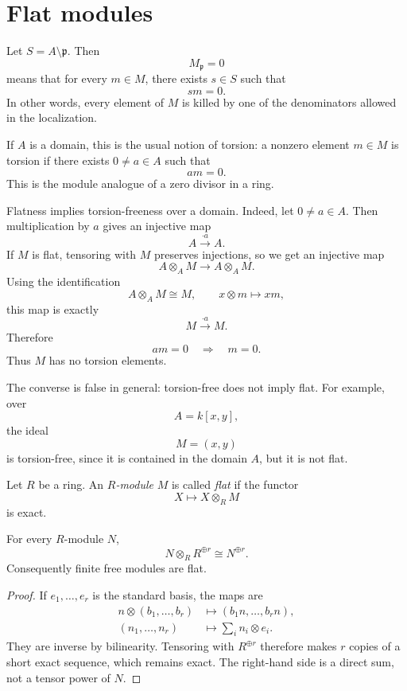 \section{Flat modules}
\label{section-flat-modules}

\noindent
Let $S=A\setminus \mathfrak p$. Then
$$
M_{\mathfrak p}=0
$$
means that for every $m\in M$,
there exists $s\in S$ such that
$$
sm=0.
$$
In other words, every element of $M$
is killed by one of the denominators
allowed in the localization.

If $A$ is a domain, this is the usual
notion of torsion: a nonzero element
$m\in M$ is torsion if there exists
$0\neq a\in A$ such that
$$
am=0.
$$
This is the module analogue of a zero
divisor in a ring.

Flatness implies torsion-freeness over
a domain. Indeed, let $0\neq a\in A$.
Then multiplication by $a$ gives an
injective map
$$
A \xrightarrow{\cdot a} A.
$$
If $M$ is flat, tensoring with $M$
preserves injections, so we get an
injective map
$$
A\otimes_A M
\longrightarrow
A\otimes_A M.
$$
Using the identification
$$
A\otimes_A M \cong M,
\qquad
x\otimes m \mapsto xm,
$$
this map is exactly
$$
M \xrightarrow{\cdot a} M.
$$
Therefore
$$
am=0
\quad\Longrightarrow\quad
m=0.
$$
Thus $M$ has no torsion elements.

The converse is false in general:
torsion-free does not imply flat.
For example, over
$$
A=k[x,y],
$$
the ideal
$$
M=(x,y)
$$
is torsion-free, since it is contained
in the domain $A$, but it is not flat.

\begin{definition}
\label{definition-flat-module}
Let $R$ be a ring.
An {\it $R$-module} $M$ is called
{\it flat}
if the functor
$$
X \mapsto X \otimes_R M
$$
is exact.
\end{definition}

\begin{lemma}
\label{lemma-free-tensor-copies}
For every $R$-module $N$,
$$
N\otimes_R R^{\oplus r}\cong N^{\oplus r}.
$$
Consequently finite free modules are flat.
\end{lemma}

\begin{proof}
If $e_1,\ldots,e_r$ is the standard
basis, the maps are
$$
\begin{aligned}
n\otimes(b_1,\ldots,b_r)
&\longmapsto(b_1n,\ldots,b_rn),\\
(n_1,\ldots,n_r)
&\longmapsto\sum_i n_i\otimes e_i.
\end{aligned}
$$
They are inverse by bilinearity.
Tensoring with $R^{\oplus r}$ therefore
makes $r$ copies of a short exact
sequence, which remains exact.
The right-hand side is a direct sum,
not a tensor power of $N$.
\end{proof}

